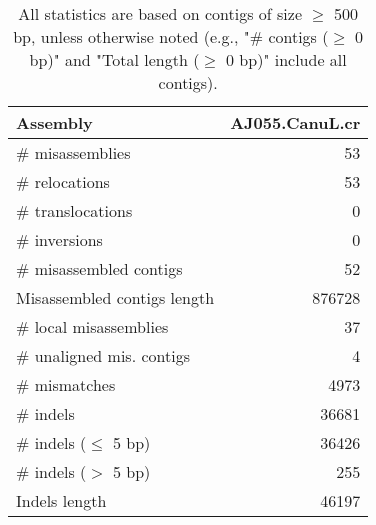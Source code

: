 \documentclass[12pt,a4paper]{article}
\begin{document}
\begin{table}[ht]
\begin{center}
\caption{All statistics are based on contigs of size $\geq$ 500 bp, unless otherwise noted (e.g., "\# contigs ($\geq$ 0 bp)" and "Total length ($\geq$ 0 bp)" include all contigs).}
\begin{tabular}{|l*{1}{|r}|}
\hline
Assembly & AJ055.CanuL.cr \\ \hline
\# misassemblies & 53 \\ \hline
\hspace{5mm}\# relocations & 53 \\ \hline
\hspace{5mm}\# translocations & 0 \\ \hline
\hspace{5mm}\# inversions & 0 \\ \hline
\# misassembled contigs & 52 \\ \hline
Misassembled contigs length & 876728 \\ \hline
\# local misassemblies & 37 \\ \hline
\# unaligned mis. contigs & 4 \\ \hline
\# mismatches & 4973 \\ \hline
\# indels & 36681 \\ \hline
\hspace{5mm}\# indels ($\leq$ 5 bp) & 36426 \\ \hline
\hspace{5mm}\# indels ($>$ 5 bp) & 255 \\ \hline
Indels length & 46197 \\ \hline
\end{tabular}
\end{center}
\end{table}
\end{document}

